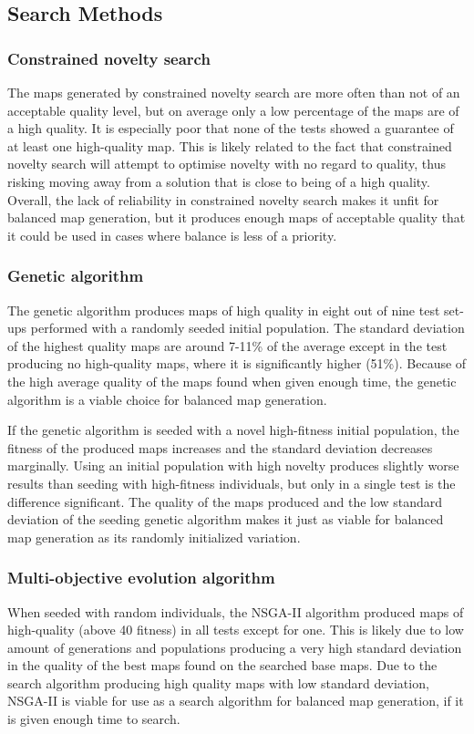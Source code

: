 \subsection{Search Methods}
\label{discussion_quality_searchmethods}
\subsubsection{Constrained novelty search}
The maps generated by constrained novelty search are more often than not of an acceptable quality level, but on average only a low percentage of the maps are of a high quality. It is especially poor that none of the tests showed a guarantee of at least one high-quality map. This is likely related to the fact that constrained novelty search will attempt to optimise novelty with no regard to quality, thus risking moving away from a solution that is close to being of a high quality. Overall, the lack of reliability in constrained novelty search makes it unfit for balanced map generation, but it produces enough maps of acceptable quality that it could be used in cases where balance is less of a priority.

\subsubsection{Genetic algorithm}
The genetic algorithm produces maps of high quality in eight out of nine test set-ups performed with a randomly seeded initial population. The standard deviation of the highest quality maps are around 7-11\% of the average except in the test producing no high-quality maps, where it is significantly higher (51\%). Because of the high average quality of the maps found when given enough time, the genetic algorithm is a viable choice for balanced map generation. 

If the genetic algorithm is seeded with a novel high-fitness initial population, the fitness of the produced maps increases and the standard deviation decreases marginally. Using an initial population with high novelty produces slightly worse results than seeding with high-fitness individuals, but only in a single test is the difference significant. The quality of the maps produced and the low standard deviation of the seeding genetic algorithm makes it just as viable for balanced map generation as its randomly initialized variation.

\subsubsection{Multi-objective evolution algorithm}
When seeded with random individuals, the NSGA-II algorithm produced maps of high-quality (above 40 fitness) in all tests except for one. This is likely due to low amount of generations and populations producing a very high standard deviation in the quality of the best maps found on the searched base maps. Due to the search algorithm producing high quality maps with low standard deviation, NSGA-II is viable for use as a search algorithm for balanced map generation, if it is given enough time to search.

